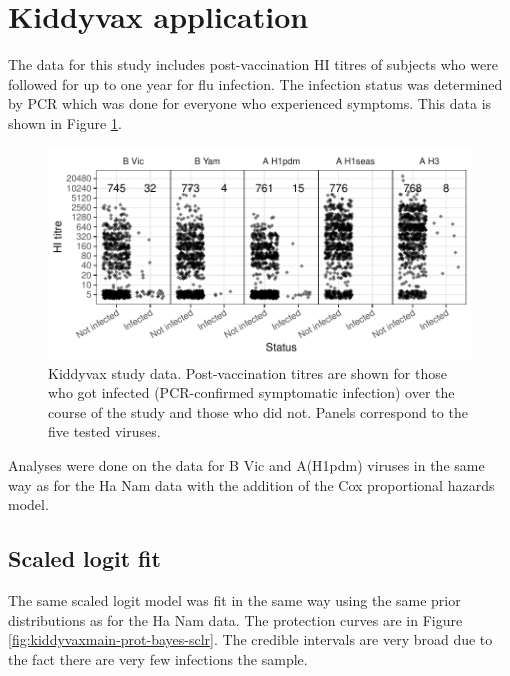 \documentclass[12pt]{article}
\begin{document}
\section{Kiddyvax application}

The data for this study includes post-vaccination HI titres of subjects who were followed for up to one year for flu infection. The infection status was determined by PCR which was done for everyone who experienced symptoms. This data is shown in Figure \ref{fig:kiddyvax-main-titre}.

\begin{figure}[htp]
	\centering
	\includegraphics[width=1\textwidth]{../data-plot/kiddyvax-main-titre.pdf}
	\caption{
	Kiddyvax study data. Post-vaccination titres are shown for those who got infected (PCR-confirmed symptomatic infection) over the course of the study and those who did not. Panels correspond to the five tested viruses.
	}
	\label{fig:kiddyvax-main-titre}
\end{figure}

Analyses were done on the data for B Vic and A(H1pdm) viruses in the same way as for the Ha Nam data with the addition of the Cox proportional hazards model.

%
\subsection{Scaled logit fit}

The same scaled logit model was fit in the same way using the same prior distributions as for the Ha Nam data. The protection curves are in Figure \ref{fig:kiddyvaxmain-prot-bayes-sclr}. The credible intervals are very broad due to the fact there are very few infections the sample.
\end{document}
